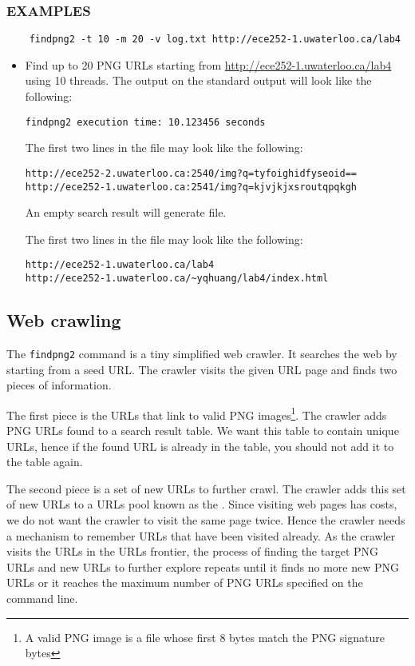 \subsubsection*{EXAMPLES}
\begin{verbatim}
    findpng2 -t 10 -m 20 -v log.txt http://ece252-1.uwaterloo.ca/lab4
\end{verbatim}
\begin{itemize}
\item[]Find up to 20 PNG URLs starting from \url{http://ece252-1.uwaterloo.ca/lab4} using 10 threads.
The output on the standard output will look like the following:
\begin{verbatim}
findpng2 execution time: 10.123456 seconds
\end{verbatim}
The first two lines in the  file may look like the following:
\begin{verbatim}
http://ece252-2.uwaterloo.ca:2540/img?q=tyfoighidfyseoid==
http://ece252-1.uwaterloo.ca:2541/img?q=kjvjkjxsroutqpqkgh
\end{verbatim}
An empty search result will generate  file.

The first two lines in the  file may look like the following:
\begin{verbatim}
http://ece252-1.uwaterloo.ca/lab4
http://ece252-1.uwaterloo.ca/~yqhuang/lab4/index.html
\end{verbatim}
\end{itemize}

\subsection{Web crawling}
The \verb+findpng2+ command is a tiny simplified web crawler. It searches the web by starting from a seed URL. The crawler visits the given URL page and finds two pieces of information.

The first piece is the URLs that link to valid PNG images\footnote{A valid PNG image is a file whose first 8 bytes match the PNG signature bytes}. The crawler adds PNG URLs found to a search result table. We want this table to contain unique URLs, hence if the found URL is already in the table, you should not add it to the table again.

The second piece is a set of new URLs to further crawl. The crawler adds this set of new URLs to a URLs pool known as the . Since visiting web pages has costs, we do not want the crawler to visit the same page twice. Hence the crawler needs a mechanism to remember URLs that have been visited already. As the crawler visits the URLs in the URLs frontier, the process of finding the target PNG URLs and new URLs to further explore repeats until it finds no more new PNG URLs or it reaches the maximum number of PNG URLs specified on the command line.

